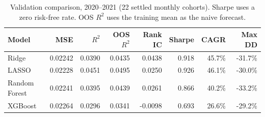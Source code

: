 \begin{table}[H]
\centering
\small
\begin{tabular}{lrrrrrrr}
\toprule
Model & MSE & $R^2$ & OOS $R^2$ & Rank IC & Sharpe & CAGR & Max DD \\
\midrule
Ridge & 0.02242 & 0.0390 & 0.0435 & 0.0438 & 0.918 & 45.7\% & -31.7\% \\
LASSO & 0.02228 & 0.0451 & 0.0495 & 0.0250 & 0.926 & 46.1\% & -30.0\% \\
Random Forest & 0.02241 & 0.0395 & 0.0439 & 0.0261 & 0.866 & 40.2\% & -33.2\% \\
XGBoost & 0.02264 & 0.0296 & 0.0341 & -0.0098 & 0.693 & 26.6\% & -29.2\% \\
\bottomrule
\end{tabular}
\caption{Validation comparison, 2020--2021 (22 settled monthly cohorts). Sharpe uses a zero risk-free rate. OOS $R^2$ uses the training mean as the naive forecast.}
\label{tab:validation}
\end{table}

